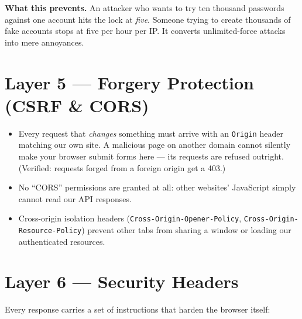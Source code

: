 \documentclass[11pt,letterpaper]{report}
\begin{document}
\begin{plainbox}
\textbf{What this prevents.} An attacker who wants to try ten thousand passwords
against one account hits the lock at \emph{five}. Someone trying to create
thousands of fake accounts stops at five per hour per IP. It converts
unlimited-force attacks into mere annoyances.
\end{plainbox}

\section{Layer 5 --- Forgery Protection (CSRF \& CORS)}

\begin{itemize}[leftmargin=1.4em]
  \item Every request that \emph{changes} something must arrive with an
        \texttt{Origin} header matching our own site. A malicious page on
        another domain cannot silently make your browser submit forms here ---
        its requests are refused outright. (Verified: requests forged from a
        foreign origin get a 403.)
  \item No ``CORS'' permissions are granted at all: other websites' JavaScript
        simply cannot read our API responses.
  \item Cross-origin isolation headers (\texttt{Cross-Origin-Opener-Policy},
        \texttt{Cross-Origin-Resource-Policy}) prevent other tabs from sharing a
        window or loading our authenticated resources.
\end{itemize}

\section{Layer 6 --- Security Headers}

Every response carries a set of instructions that harden the browser itself:
\end{document}
